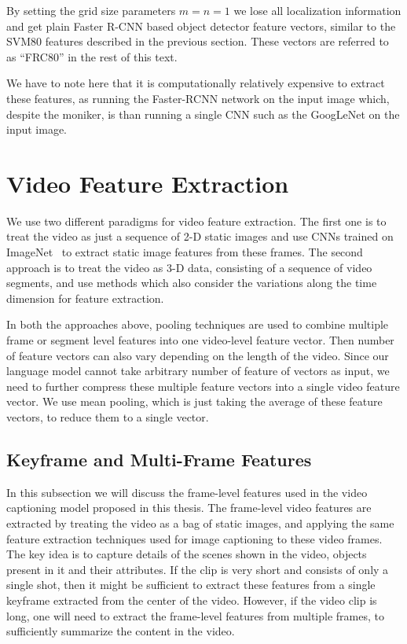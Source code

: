 By setting the grid size parameters $m=n=1$ we lose all localization information
and get plain Faster R-CNN based object detector feature vectors, similar to the SVM80
features described in the previous section.
These vectors are referred to as ``FRC80'' in the rest of this text. 

We have to note here that it is computationally relatively expensive to extract
these features, as  running the Faster-RCNN network on the input image which,
despite the moniker, is  than running a single CNN such as the
GoogLeNet on the input image.

\section{Video Feature Extraction}
\label{sec:VideoFeat}
We use two different paradigms for video feature extraction.
The first one is to treat the video as just a sequence of 2-D static images and
use CNNs trained on ImageNet~\cite{ImagenetOrig} to extract static image
features from these frames.
The second approach is to treat the video as 3-D data, consisting of a
sequence of video segments, and use methods which also consider the variations
along the time dimension for feature extraction.

In both the approaches above, pooling techniques are used to combine multiple
frame or segment level features into one video-level feature vector.
Then number of feature vectors can also vary depending on the length of the
video.
Since our language model cannot take arbitrary number of feature of vectors as
input, we need to further compress these multiple feature vectors into a single
video feature vector. 
We use mean pooling, which is just taking the average of these feature vectors,
to reduce them to a single vector.

\subsection{Keyframe and Multi-Frame Features}
In this subsection we will discuss the frame-level features used in the video
captioning model proposed in this thesis.
The frame-level video features are extracted by treating the video as a bag of
static images, and applying the same feature extraction techniques used for
image captioning to these video frames.
The key idea is to capture details of the scenes shown in the video, objects
present in it and their attributes.
If the clip is very short and consists of only a single shot, then it might be
sufficient to extract these features from a single keyframe extracted from the
center of the video. 
However, if the video clip is long, one will need to extract the frame-level
features from multiple frames, to sufficiently summarize the content in the
video.

